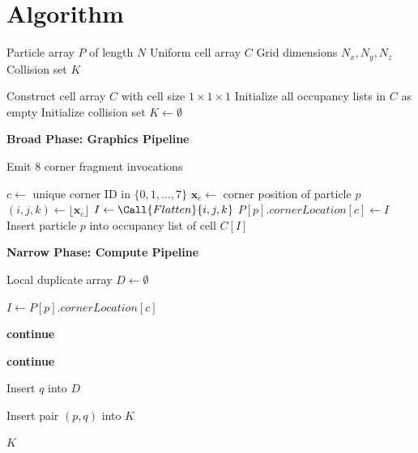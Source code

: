 
\section{Algorithm}

\begin{algorithm}
\caption{gPCD Broad-Phase and Narrow-Phase Collision Detection}
\begin{algorithmic}[1]

\Require Particle array $P$ of length $N$
\Require Uniform cell array $C$
\Require Grid dimensions $N_x, N_y, N_z$
\Ensure Collision set $K$

\State Construct cell array $C$ with cell size $1 \times 1 \times 1$
\State Initialize all occupancy lists in $C$ as empty
\State Initialize collision set $K \gets \emptyset$

\Statex
\Statex \textbf{Broad Phase: Graphics Pipeline}

    \State Emit $8$ corner fragment invocations
\EndFor

    \State $c \gets$ unique corner ID in $\{0,1,\dots,7\}$
    \State $\mathbf{x}_c \gets$ corner position of particle $p$
    \State $(i,j,k) \gets \lfloor \mathbf{x}_c \rfloor$
    \State $I \gets \Call{Flatten}{i,j,k}$
    \State $P[p].\textit{cornerLocation}[c] \gets I$
    \State Insert particle $p$ into occupancy list of cell $C[I]$
\EndFor

\Statex
\Statex \textbf{Narrow Phase: Compute Pipeline}

    \State Local duplicate array $D \gets \emptyset$

        \State $I \gets P[p].\textit{cornerLocation}[c]$

                \State \textbf{continue}
            \EndIf

                \State \textbf{continue}
            \EndIf

            \State Insert $q$ into $D$

                \State Insert pair $(p,q)$ into $K$
            \EndIf
        \EndFor
    \EndFor
\EndFor

\State \Return $K$

\end{algorithmic}
\end{algorithm}

